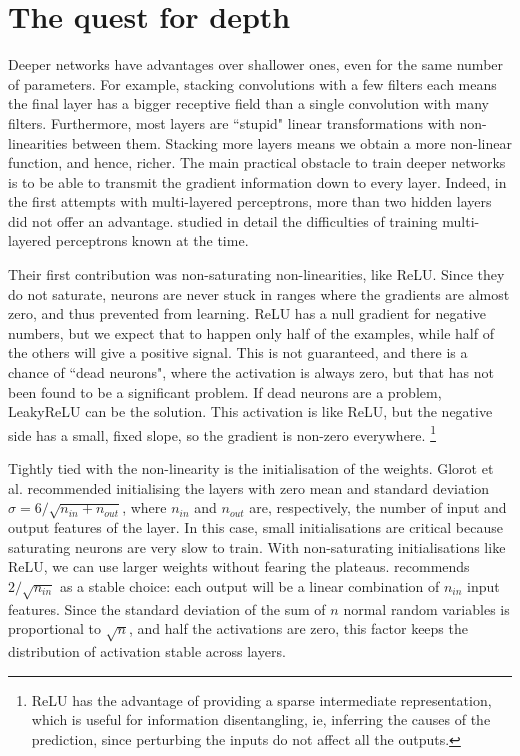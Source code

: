 \section{The quest for depth}\label{sec:depth}
Deeper networks have advantages over shallower ones, even for the same number of parameters.
For example, stacking convolutions with a few filters each means the final layer has a bigger receptive field than a single convolution with many filters.
Furthermore, most layers are ``stupid" linear transformations with non-linearities between them.
Stacking more layers means we obtain a more non-linear function, and hence, richer.
The main practical obstacle to train deeper networks is to be able to transmit the gradient information down to every layer.
Indeed, in the first attempts with multi-layered perceptrons, more than two hidden layers did not offer an advantage.
\citet{glorot} studied in detail the difficulties of training multi-layered perceptrons known at the time.

Their first contribution  was non-saturating non-linearities, like ReLU.
Since they do not saturate, neurons are never stuck in ranges where the gradients are almost zero, and thus prevented from learning.
ReLU has a null gradient for negative numbers, but we expect that to happen only half of the examples, while half of the others will give a positive signal.
This is not guaranteed, and there is a chance of ``dead neurons", where the activation is always zero, but that has not been found to be a significant problem.
If dead neurons are a problem, LeakyReLU   can be the solution.
This activation is like ReLU, but the negative side has a small, fixed slope, so the gradient is non-zero everywhere.
\footnote{ReLU has the advantage of providing a sparse intermediate representation, which is useful for information disentangling, ie, inferring the causes of the prediction, since perturbing the inputs do not affect all the outputs.}

Tightly tied  with the non-linearity is the initialisation of the weights.
Glorot et al. recommended initialising the layers with zero mean and standard deviation $\sigma=6/\sqrt{n_{in}+ n_{out}}$, where $n_{in}$ and $n_{out}$ are, respectively, the number of input and output features of the layer.
In this case, small initialisations are critical because saturating neurons are very slow to train.
With non-saturating initialisations like ReLU, we can use larger weights without fearing the plateaus.
\citet{he} recommends $2/\sqrt{n_{in}}$ as a stable choice: each output will be a linear combination of $n_{in}$ input features.
Since the standard deviation of the sum of $n$ normal random variables is proportional to $\sqrt{n}$, and half the activations are zero, this factor keeps the distribution of activation stable across layers.

